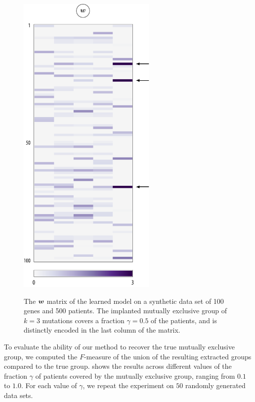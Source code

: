 \begin{figure}[p]
\centering
\includegraphics[width=0.6\textwidth]{figures/genes/mat_syn.pdf}\\[1em]
\caption{The $\bm{w}$ matrix of the learned \fldc{} model on a synthetic data set of 100 genes and 500 patients.
The implanted mutually exclusive group of $k = 3$ mutations covers a fraction $\gamma = 0.5$ of the patients, and is distinctly encoded in the last column of the matrix.}
\label{fig:syn_mat}
\end{figure}

To evaluate the ability of our method to recover the true mutually exclusive group, we computed the $F$-measure of the union of the resulting extracted groups compared to the true group.
 shows the results across different values of the fraction $\gamma$ of patients covered by the mutually exclusive group, ranging from $0.1$ to $1.0$.
For each value of $\gamma$, we repeat the experiment on $50$ randomly generated data sets.


